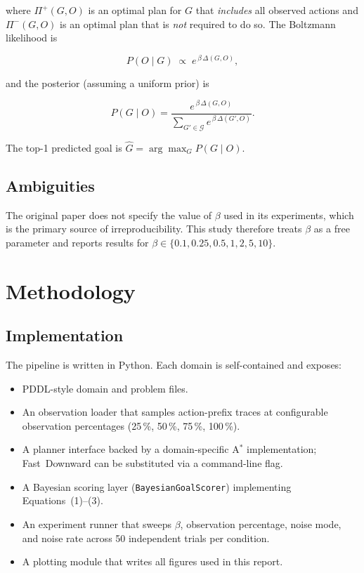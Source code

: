 \documentclass[11pt,a4paper]{article}
\begin{document}
\noindent where $\Pi^+(G,O)$ is an optimal plan for $G$ that \emph{includes} all
observed actions and $\Pi^-(G,O)$ is an optimal plan that is \emph{not} required
to do so.  The Boltzmann likelihood is

\begin{equation}
  P(O \mid G) \;\propto\; e^{\,\beta\,\Delta(G,O)},
\end{equation}

\noindent and the posterior (assuming a uniform prior) is

\begin{equation}
  P(G \mid O) = \frac{e^{\,\beta\,\Delta(G,O)}}{\displaystyle\sum_{G' \in \mathcal{G}} e^{\,\beta\,\Delta(G',O)}}.
\end{equation}

The top-1 predicted goal is $\hat{G} = \arg\max_{G} P(G \mid O)$.

\subsection{Ambiguities}

The original paper does not specify the value of $\beta$ used in its
experiments, which is the primary source of irreproducibility.  This study
therefore treats $\beta$ as a free parameter and reports results for
$\beta \in \{0.1, 0.25, 0.5, 1, 2, 5, 10\}$.

\section{Methodology}

\subsection{Implementation}

The pipeline is written in Python.  Each domain is self-contained and exposes:

\begin{itemize}
  \item PDDL-style domain and problem files.
  \item An observation loader that samples action-prefix traces at configurable
        observation percentages (25\,\%, 50\,\%, 75\,\%, 100\,\%).
  \item A planner interface backed by a domain-specific A$^*$ implementation;
        Fast~Downward can be substituted via a command-line flag.
  \item A Bayesian scoring layer (\texttt{BayesianGoalScorer}) implementing
        Equations~(1)--(3).
  \item An experiment runner that sweeps $\beta$, observation percentage, noise
        mode, and noise rate across 50 independent trials per condition.
  \item A plotting module that writes all figures used in this report.
\end{itemize}
\end{document}
